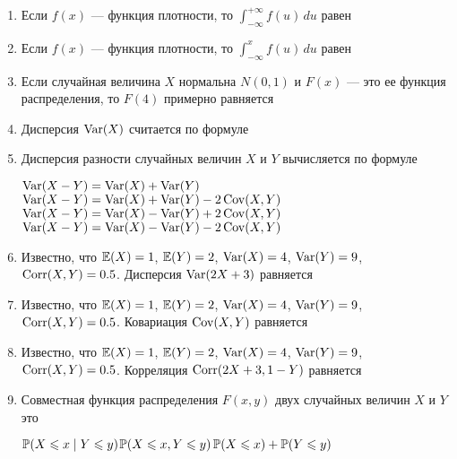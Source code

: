 \begin{enumerate}
\item Если $f(x)$ — функция плотности, то $\int_{-\infty}^{+\infty}f(u)\,du$ равен


\item Если $f(x)$ — функция плотности, то $\int_{-\infty}^{x}f(u)\,du$ равен


\item Если случайная величина $X$ нормальна $N(0,1)$ и $F(x)$ — это ее функция распределения, то $F(4)$ примерно равняется


\newpage


\item Дисперсия $\Var(X)$ считается по формуле


\item Дисперсия разности случайных величин $X$ и $Y$ вычисляется по формуле

{$\Var(X-Y)=\Var(X)+\Var(Y)$}
{$\Var(X-Y)=\Var(X)+\Var(Y)-2\Cov(X,Y)$}
{$\Var(X-Y)=\Var(X)-\Var(Y)+2\Cov(X,Y)$}
{$\Var(X-Y)=\Var(X)-\Var(Y)-2\Cov(X,Y)$}

\item Известно, что $\E(X)=1$, $\E(Y)=2$, $\Var(X)=4$, $\Var(Y)=9$, $\Corr(X,Y)=0.5$. Дисперсия $\Var(2X+3)$  равняется



\item Известно, что $\E(X)=1$, $\E(Y)=2$, $\Var(X)=4$, $\Var(Y)=9$, $\Corr(X,Y)=0.5$. Ковариация $\Cov(X,Y)$  равняется



\item Известно, что $\E(X)=1$, $\E(Y)=2$, $\Var(X)=4$, $\Var(Y)=9$, $\Corr(X,Y)=0.5$. Корреляция $\Corr(2X+3,1-Y)$  равняется


\item Совместная функция распределения $F(x,y)$ двух случайных величин $X$ и $Y$ это

{$\P(X\leq x\mid Y\leq y)$}{$\P(X\leq x,Y\leq y)$}{$\P(X\leq x)+\P(Y\leq y)$}


\end{enumerate}
